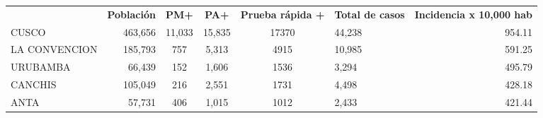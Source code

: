 \begin{tabular}{lrccclr}
	\rowcolor[HTML]{DCE6F1} 
	\multicolumn{1}{c}{\cellcolor[HTML]{DCE6F1}\textbf{PROVINCIA}} & \multicolumn{1}{c}{\cellcolor[HTML]{DCE6F1}\textbf{Población}} & \textbf{PM+}                                                & \textbf{PA+}         & \textbf{Prueba rápida +} & \multicolumn{1}{c}{\cellcolor[HTML]{DCE6F1}\textbf{Total de casos}} & \multicolumn{1}{c}{\cellcolor[HTML]{DCE6F1}\textbf{Incidencia x 10,000 hab}} \\
	\cellcolor[HTML]{FF5050}CUSCO                                  & 463,656                                                        & 11,033                                                      & 15,835               & 17370                    & 44,238                                                              & 954.11                                                                       \\
	\cellcolor[HTML]{F4B084}LA   CONVENCION                        & 185,793                                                        & 757                                                         & 5,313                & 4915                     & 10,985                                                              & 591.25                                                                       \\
	\cellcolor[HTML]{F4B084}URUBAMBA                               & 66,439                                                         & 152                                                         & 1,606                & 1536                     & 3,294                                                               & 495.79                                                                       \\
	\cellcolor[HTML]{FFE699}CANCHIS                                & 105,049                                                        & 216                                                         & 2,551                & 1731                     & 4,498                                                               & 428.18                                                                       \\
	\cellcolor[HTML]{FFE699}ANTA                                   & 57,731                                                         & 406                                                         & 1,015                & 1012                     & 2,433                                                               & 421.44                                                                       \\

\end{tabular}

